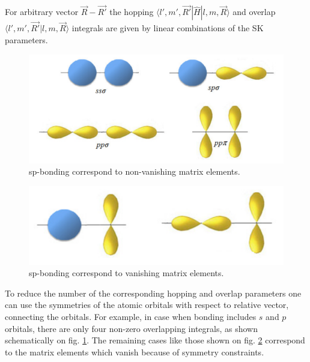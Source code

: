 For arbitrary vector $\vec{R} - \vec{R'} $ the hopping $\langle l', m', \vec{R'} | \hat{H} | l,m,\vec{R} \rangle$ and overlap $\langle l', m', \vec{R'} | l,m,\vec{R} \rangle$ integrals are given by linear combinations of the SK parameters. 

\begin{figure}[h]
  \includegraphics[width=\linewidth]{img/sp_bonding}
  \caption[caption]{sp-bonding correspond to non-vanishing matrix elements. \footnotemark\label{fig:sp} }
\end{figure}
\begin{figure}[h]  
  \includegraphics[width=\linewidth]{img/sp_vanishing}
  \caption[caption]{sp-bonding correspond to vanishing matrix elements.\footnotemark \label{fig:sp_vanishing}}
\end{figure}

To reduce the number of the corresponding hopping and overlap parameters one can use the symmetries of the atomic orbitals with respect to relative vector, connecting the orbitals. For example, in case when bonding includes $s$ and $p$ orbitals, there are only four non-zero overlapping integrals, as shown schematically on fig. \ref{fig:sp}. The remaining cases like those shown on fig. \ref{fig:sp_vanishing} correspond to the matrix elements which vanish because of symmetry constraints. 

